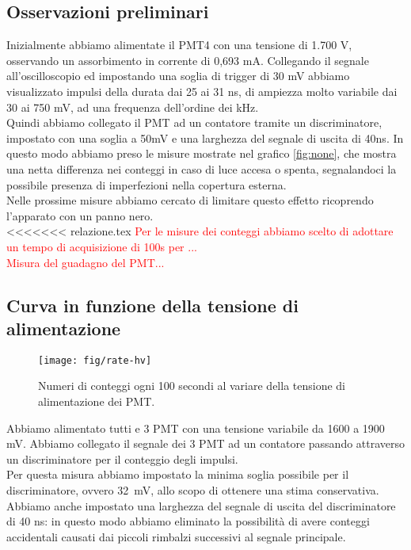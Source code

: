 \documentclass[a4paper,10pt]{article}
\newcommand{\note}[1]{\textcolor{red}{#1}}
\begin{document}
\subsection{Osservazioni preliminari}
Inizialmente abbiamo alimentate il PMT4 con una tensione di 1.700 V, osservando un assorbimento in corrente di 0,693 mA. Collegando il segnale all'oscilloscopio ed impostando una soglia di trigger di 30 mV abbiamo visualizzato impulsi della durata dai 25 ai 31 ns, di ampiezza molto variabile dai 30 ai 750 mV, ad una frequenza dell'ordine dei kHz.
\\
Quindi abbiamo collegato il PMT ad un contatore tramite un discriminatore, impostato con una soglia a 50mV e una larghezza del segnale di uscita di 40ns. In questo modo abbiamo preso le misure mostrate nel grafico \ref{fig:none}, che mostra una netta differenza nei conteggi in caso di luce accesa o spenta, segnalandoci la possibile presenza di imperfezioni nella copertura esterna.
\\
Nelle prossime misure abbiamo cercato di limitare questo effetto ricoprendo l'apparato con un panno nero.
\\
<<<<<<< relazione.tex
\note{Per le misure dei conteggi abbiamo scelto di adottare un tempo di acquisizione di 100s per ...}
\\
\note{Misura del guadagno del PMT...}
\subsection{Curva in funzione della tensione di alimentazione}
\begin{figure}
\centering
\texttt{[image: fig/rate-hv]}
\caption{Numeri di conteggi ogni 100 secondi al variare della tensione di alimentazione dei PMT.}
\label{fig:rate-hv}
\end{figure}
Abbiamo alimentato tutti e 3 PMT con una tensione variabile da 1600 a 1900 mV. Abbiamo collegato il segnale dei 3 PMT ad un contatore passando attraverso un discriminatore per il conteggio degli impulsi.\\

Per questa misura abbiamo impostato la minima soglia possibile per il discriminatore, ovvero 32~mV, allo scopo di ottenere una stima conservativa. 
Abbiamo anche impostato una larghezza del segnale di uscita del discriminatore di 40 ns: in questo modo abbiamo eliminato la possibilità di avere conteggi accidentali causati dai piccoli rimbalzi successivi al segnale principale. 
\end{document}
